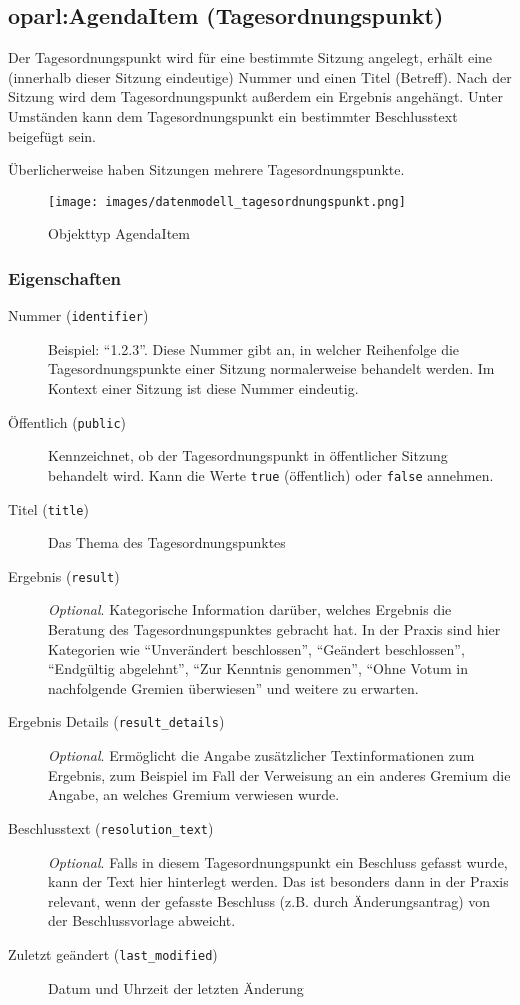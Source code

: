 \documentclass[,a4paper]{article}
\makeatletter
\def\maxwidth{\ifdim\Gin@nat@width>\linewidth\linewidth
\else\Gin@nat@width\fi}
\let\Oldincludegraphics\includegraphics
\renewcommand{\includegraphics}[1]{\Oldincludegraphics[width=\maxwidth]{#1}}
\makeatother
\begin{document}
\subsection{oparl:AgendaItem (Tagesordnungspunkt)}

Der Tagesordnungspunkt wird für eine bestimmte Sitzung angelegt, erhält
eine (innerhalb dieser Sitzung eindeutige) Nummer und einen Titel
(Betreff). Nach der Sitzung wird dem Tagesordnungspunkt außerdem ein
Ergebnis angehängt. Unter Umständen kann dem Tagesordnungspunkt ein
bestimmter Beschlusstext beigefügt sein.

Überlicherweise haben Sitzungen mehrere Tagesordnungspunkte.

\begin{figure}[htbp]
\centering
\texttt{[image: images/datenmodell\_tagesordnungspunkt.png]}
\caption{Objekttyp AgendaItem}
\end{figure}

\subsubsection{Eigenschaften}

\begin{description}
\item[Nummer (\texttt{identifier})]
Beispiel: ``1.2.3''. Diese Nummer gibt an, in welcher Reihenfolge die
Tagesordnungspunkte einer Sitzung normalerweise behandelt werden. Im
Kontext einer Sitzung ist diese Nummer eindeutig.
\item[Öffentlich (\texttt{public})]
Kennzeichnet, ob der Tagesordnungspunkt in öffentlicher Sitzung
behandelt wird. Kann die Werte \texttt{true} (öffentlich) oder
\texttt{false} annehmen.
\item[Titel (\texttt{title})]
Das Thema des Tagesordnungspunktes
\item[Ergebnis (\texttt{result})]
\emph{Optional}. Kategorische Information darüber, welches Ergebnis die
Beratung des Tagesordnungspunktes gebracht hat. In der Praxis sind hier
Kategorien wie ``Unverändert beschlossen'', ``Geändert beschlossen'',
``Endgültig abgelehnt'', ``Zur Kenntnis genommen'', ``Ohne Votum in
nachfolgende Gremien überwiesen'' und weitere zu erwarten.
\item[Ergebnis Details (\texttt{result\_details})]
\emph{Optional}. Ermöglicht die Angabe zusätzlicher Textinformationen
zum Ergebnis, zum Beispiel im Fall der Verweisung an ein anderes Gremium
die Angabe, an welches Gremium verwiesen wurde.
\item[Beschlusstext (\texttt{resolution\_text})]
\emph{Optional}. Falls in diesem Tagesordnungspunkt ein Beschluss
gefasst wurde, kann der Text hier hinterlegt werden. Das ist besonders
dann in der Praxis relevant, wenn der gefasste Beschluss (z.B. durch
Änderungsantrag) von der Beschlussvorlage abweicht.
\item[Zuletzt geändert (\texttt{last\_modified})]
Datum und Uhrzeit der letzten Änderung
\end{description}
\end{document}
